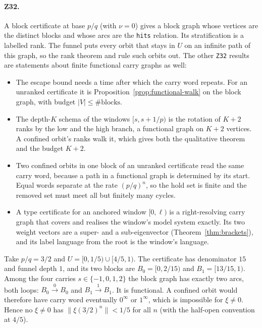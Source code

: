 \paragraph{Z32.} A block certificate at base \(p/q\) (with \(\nu=0\)) gives a block graph whose
vertices are the distinct blocks and whose arcs are the \texttt{hits} relation. Its
stratification is a labelled rank. The funnel puts every orbit that stays in \(U\) on an
infinite path of this graph, so the rank theorem and \cite[Lemma~2]{DN05} rule such orbits out.
The other \texttt{Z32} results are statements about finite functional carry graphs as well:
\begin{itemize}
\item The escape bound needs a time after which the carry word repeats. For an unranked
certificate it is Proposition~\ref{prop:functional-walk} on the block graph, with budget
\(|V|\le\#\text{blocks}\).
\item The depth-\(K\) schema of the windows \([s,s+1/p)\) is the rotation of \(K+2\) ranks by the
low and the high branch, a functional graph on \(K+2\) vertices. A confined orbit's ranks walk
it, which gives both the qualitative theorem and the budget \(K+2\).
\item Two confined orbits in one block of an unranked certificate read the same carry word,
because a path in a functional graph is determined by its start. Equal words separate at the
rate \((p/q)^n\), so the hold set is finite and the removed set must meet all but finitely many
cycles.
\item A type certificate for an anchored window \([0,\ell)\) is a right-resolving carry graph that
covers and realises the window's model system exactly. Its two weight vectors are a super- and a
sub-eigenvector (Theorem~\ref{thm:brackets}), and its label language from the root is the
window's language.
\end{itemize}

\begin{example}\label{ex:two-cell}
Take \(p/q=3/2\) and \(U=[0,1/5)\cup[4/5,1)\). The certificate has denominator \(15\) and funnel
depth \(1\), and its two blocks are \(B_0=[0,2/15)\) and \(B_1=[13/15,1)\). Among the four carries
\(s\in\{-1,0,1,2\}\) the block graph has exactly two arcs, both loops: \(B_0\xrightarrow{0}B_0\)
and \(B_1\xrightarrow{1}B_1\). It is functional. A confined orbit would therefore have carry word
eventually \(0^\infty\) or \(1^\infty\), which is impossible for \(\xi\ne0\). Hence no \(\xi\ne0\)
has \(\lVert\xi(3/2)^n\rVert<1/5\) for all \(n\) (with the half-open convention at \(4/5\)).
\end{example}

